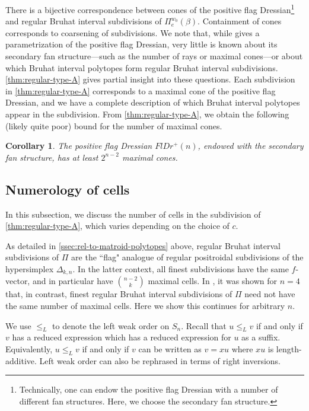 \documentclass[11pt]{amsart}
\newtheorem{corollary}[Thm]{Corollary}
\theoremstyle{definition}
\def\pt{\beta}
\begin{document}
There is a bijective correspondence between cones of the positive flag Dressian\footnote{Technically, one can endow the positive flag Dressian with a number of different fan structures. Here, we choose the secondary fan structure.} and regular Bruhat interval subdivisions of $\Pi_e^{w_0}(\pt)$. Containment of cones corresponds to coarsening of subdivisions.  We note that, while \cite{B23} gives a parametrization of the positive flag Dressian, very little is known about its secondary fan structure---such as the number of rays or maximal cones---or about which Bruhat interval polytopes form regular Bruhat interval subdivisions. \cref{thm:regular-type-A} gives partial insight into these questions. Each subdivision in \cref{thm:regular-type-A} corresponds to a maximal cone of the positive flag Dressian, and we have a complete description of which Bruhat interval polytopes appear in the subdivision. From \cref{thm:regular-type-A}, we obtain the following (likely quite poor) bound for the number of maximal cones.

\begin{corollary}
	The positive flag Dressian $FlDr^+(n)$, endowed with the secondary fan structure, has at least $2^{n-2}$ maximal cones.
\end{corollary}

\subsection{Numerology of cells}

In this subsection, we discuss the number of cells in the subdivision of \cref{thm:regular-type-A}, which varies depending on the choice of $c$.

As detailed in \cref{ssec:rel-to-matroid-polytopes} above, regular Bruhat interval subdivisions of $\Pi$ are the ``flag" analogue of regular positroidal subdivisions of the hypersimplex $\Delta_{k,n}$. In the latter context, all finest subdivisions have the same $f$-vector, and in particular have $\binom{n-2}{k}$ maximal cells. In \cite{BEW24}, it was shown for $n=4$ that, in contrast, finest regular Bruhat interval subdivisions of $\Pi$ need not have the same number of maximal cells. Here we show this continues for arbitrary $n$.

We use $\le_L$ to denote the left weak order on $S_n$. Recall that $u \le_L v$ if and only if $v$ has a reduced expression which has a reduced expression for $u$ as a suffix. Equivalently, $u \le_L v$ if and only if $v$ can be written as $v=xu$ where $xu$ is length-additive. Left weak order can also be rephrased in terms of right inversions.
\end{document}
